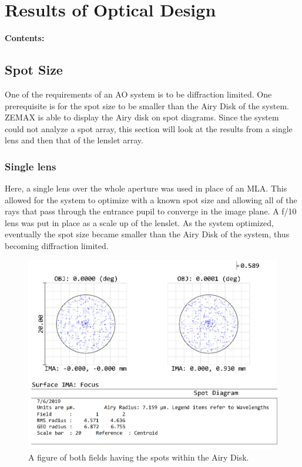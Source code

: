 \chapter{Results of Optical Design} %
\noindent\textbf{\large Contents:}

\noindent\hrulefill
\noindent\startcontents[chapters]
\noindent{}
\noindent\hrulefill
\label{Chapter4}

\section{Spot Size}
\label{sec:spot_result}

One of the requirements of an AO system is to be diffraction limited.  One prerequisite 
is for the spot size to be smaller than the Airy Disk of the system.  ZEMAX is
able to display the Airy disk on spot diagrams.  Since the system could not analyze
a spot array, this section will look at the results from a single lens and then that
of the lenslet array.

\subsection{Single lens}
\label{sec:single_spot}

Here, a single lens over the whole aperture was used in place of an MLA.  This
allowed for the system to optimize with a known spot size and allowing all of the
rays that pass through the entrance pupil to converge in the image plane.  A f/10
lens was put in place as a scale up of the lenslet.  As the system optimized,
eventually the spot size became smaller than the Airy Disk of the system, thus
becoming diffraction limited.  

\begin{figure}[h!]
\centering
\includegraphics[width=14 cm]{Figures/spot_size_lens.png}
\caption{A figure of both fields having the spots within the Airy Disk.}
\label{fig:spot_lens}
\end{figure}

